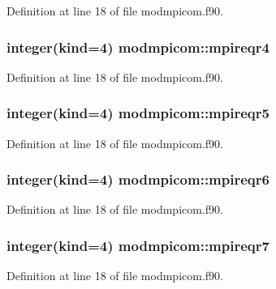 Definition at line 18 of file modmpicom.\+f90.

\subsubsection[{\texorpdfstring{mpireqr4}{mpireqr4}}]{\setlength{\rightskip}{0pt plus 5cm}integer(kind=4) modmpicom\+::mpireqr4}\hypertarget{namespacemodmpicom_a7a50a2ea228f57406a2f246a57016fa9}{}\label{namespacemodmpicom_a7a50a2ea228f57406a2f246a57016fa9}


Definition at line 18 of file modmpicom.\+f90.

\subsubsection[{\texorpdfstring{mpireqr5}{mpireqr5}}]{\setlength{\rightskip}{0pt plus 5cm}integer(kind=4) modmpicom\+::mpireqr5}\hypertarget{namespacemodmpicom_afd68da48bf63f3f360384fa66e7453bd}{}\label{namespacemodmpicom_afd68da48bf63f3f360384fa66e7453bd}


Definition at line 18 of file modmpicom.\+f90.

\subsubsection[{\texorpdfstring{mpireqr6}{mpireqr6}}]{\setlength{\rightskip}{0pt plus 5cm}integer(kind=4) modmpicom\+::mpireqr6}\hypertarget{namespacemodmpicom_a9b3e05d2267d77a7a4af942c9db7f204}{}\label{namespacemodmpicom_a9b3e05d2267d77a7a4af942c9db7f204}


Definition at line 18 of file modmpicom.\+f90.

\subsubsection[{\texorpdfstring{mpireqr7}{mpireqr7}}]{\setlength{\rightskip}{0pt plus 5cm}integer(kind=4) modmpicom\+::mpireqr7}\hypertarget{namespacemodmpicom_ad55af2a3154bdc4be9156046d29af59d}{}\label{namespacemodmpicom_ad55af2a3154bdc4be9156046d29af59d}


Definition at line 18 of file modmpicom.\+f90.

